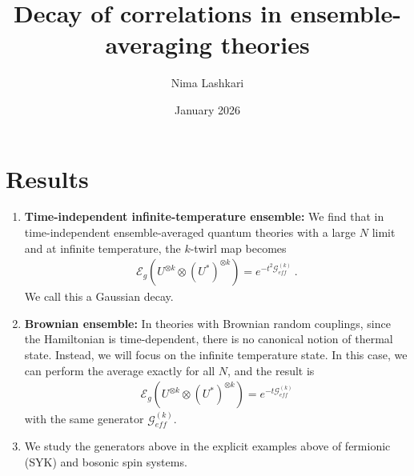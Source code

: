 \documentclass{article}
\title{Decay of correlations in ensemble-averaging theories}
\author{Nima Lashkari}
\date{January 2026}
\theoremstyle{definition}
\newcommand{\lb}{\left(}
\newcommand{\rb}{\right)}
\begin{document}
    \maketitle
    \tableofcontents

    \section*{Results}

\begin{enumerate}
    \item  {\bf Time-independent infinite-temperature ensemble:} We find that in time-independent ensemble-averaged quantum theories with a large
    $N$ limit and at infinite temperature, the $k$-twirl map becomes
    \begin{eqnarray}
        \mathcal{E}_g\lb U^{\otimes k}\otimes (U^*)^{\otimes k} \rb=e^{-t^2\mathcal{G}_{eff}^{(k)}}\ .
    \end{eqnarray}
    We call this a Gaussian decay.
    
    \item {\bf Brownian ensemble:} In theories with Brownian random couplings, since the Hamiltonian is time-dependent,
    there is no canonical notion of thermal state. Instead, we will focus on the
    infinite temperature state. In this case, we can perform the average exactly
    for all $N$, and the result is
    \begin{eqnarray}
        \mathcal{E}_g\lb U^{\otimes k}\otimes (U^*)^{\otimes k} \rb=e^{-t\mathcal{G}_{eff}^{(k)}}
    \end{eqnarray}
    with the same generator $\mathcal{G}_{eff}^{(k)}$.

    \item We study the generators above in the explicit examples above of fermionic (SYK) and bosonic spin systems. 
\end{enumerate}


    
\end{document}
